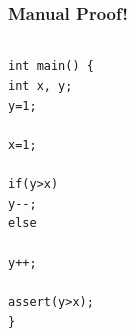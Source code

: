 \begin{frame}[fragile]
\frametitle{Manual Proof!}

\begin{columns}
\begin{column}{.6\textwidth}
\lstinline!int main() {!\\
\hspace*{0.7cm} \lstinline!int x, y;!\\[0.5ex]
\hspace*{0.7cm} \lstinline!y=1;!\\[0.5ex]
\hspace*{0.7cm} \\[0.5ex]
\hspace*{0.7cm} \lstinline!x=1;!\\[0.5ex]
\hspace*{0.7cm} \\[0.5ex]
\hspace*{0.7cm} \lstinline!if(y>x)!\\
\hspace*{1.4cm} \lstinline!y--;!\\
\hspace*{0.7cm} \lstinline!else!\\
\hspace*{1.4cm} \\[1ex]
\hspace*{1.4cm} \lstinline!y++;!\\[1ex]
\hspace*{0.7cm} \\[1ex]
\hspace*{0.7cm} \lstinline!assert(y>x);!\\
\lstinline!}!
\end{column}
\begin{column}{.3\textwidth}
\end{column}
\end{columns}

\end{frame}


